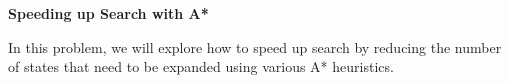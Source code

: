 \item {\bf Speeding up Search with A*}

In this problem, we will explore how to speed up search by reducing the number of states that need to be expanded using various A* heuristics.

\begin{enumerate}

  

  

  

  

\end{enumerate}

